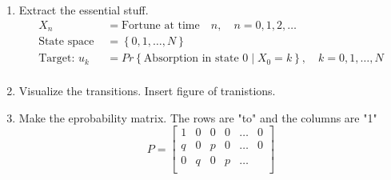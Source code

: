 \documentclass{article}
\theoremstyle{remark}
\begin{document}
\begin{enumerate}
  \item Extract the essential stuff. \[
      \begin{split}
        X_{n} &=  \text{Fortune at time} \quad  n, \quad n = 0,1,2,\ldots   \\
        \text{State space } &=  \left\{ 0,1, \ldots, N \right\} \\
        \text{Target: } u_{k}   & = Pr \left \{ \text{Absorption in state 0}  \mid X_{0} = k \right \}, \quad  k = 0,1, \ldots, N \\
      \end{split}
  \]
\item  Visualize the transitions.  Insert figure of tranistions.
   \item Make the eprobability matrix. The rows are "to" and the columns are "1"
     \[
     P = \begin{bmatrix}
     1   &  0 & 0 & 0  & \ldots  &  0 \\
     q  & 0  &   p  & 0  &   \ldots  &  0 \\
     0  &  q  &   0  &  p  &  \ldots   \\


\end{bmatrix}\]
\end{enumerate}
\end{document}
